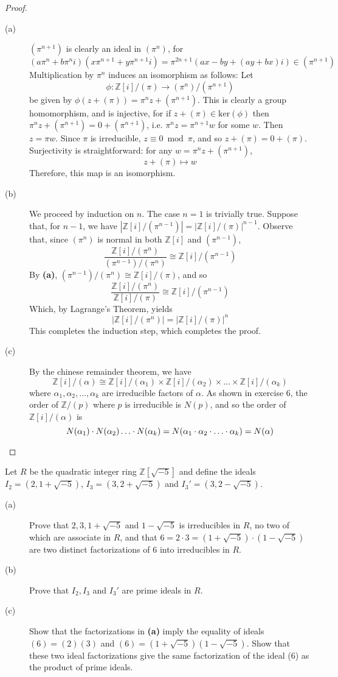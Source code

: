 \documentclass[12pt,leqno]{book}
\numberwithin{equation}{section}
\newcommand{\question}[2] {\vspace{.25in}\noindent\fbox{#1} #2 \vspace{.10in}}
\theoremstyle{definition}
\begin{document}
\begin{proof}\indent
 \begin{description}
  \item [(a)] $(\pi^{n+1})$ is clearly an ideal in $(\pi^n)$, for \[(a\pi^n+b\pi^ni)(x\pi^{n+1}+y\pi^{n+1}i)=\pi^{2n+1}(ax-by+(ay+bx)i)\in(\pi^{n+1})\] Multiplication by $\pi^n$ induces an isomorphism as follows: Let \[\phi:\mathbb{Z}[i]/(\pi)\to(\pi^n)/(\pi^{n+1})\] be given by $\phi(z+(\pi))=\pi^nz+(\pi^{n+1})$. This is clearly a group homomorphism, and is injective, for if $z+(\pi)\in\text{ker}(\phi)$ then $\pi^nz+(\pi^{n+1})=0+(\pi^{n+1})$, i.e. $\pi^nz=\pi^{n+1}w$ for some $w$. Then $z=\pi w$. Since $\pi$ is irreducible, $z\equiv0\bmod{\pi}$, and so $z+(\pi)=0+(\pi)$. Surjectivity is straightforward: for any $w=\pi^nz+(\pi^{n+1})$, \[z+(\pi)\mapsto w\] Therefore, this map is an isomorphism.
  \item [(b)] We proceed by induction on $n$. The case $n=1$ is trivially true. Suppose that, for $n-1$, we have $|\mathbb{Z}[i]/(\pi^{n-1})|=|\mathbb{Z}[i]/(\pi)|^{n-1}$. Observe that, since $(\pi^{n})$ is normal in both $\mathbb{Z}[i]$ and $(\pi^{n-1})$, \[\frac{\mathbb{Z}[i]/(\pi^n)}{(\pi^{n-1})/(\pi^n)}\cong\mathbb{Z}[i]/(\pi^{n-1})\] By \textbf{(a)}, $(\pi^{n-1})/(\pi^n)\cong\mathbb{Z}[i]/(\pi)$, and so \[\frac{\mathbb{Z}[i]/(\pi^n)}{\mathbb{Z}[i]/(\pi)}\cong\mathbb{Z}[i]/(\pi^{n-1})\] Which, by Lagrange's Theorem, yields \[|\mathbb{Z}[i]/(\pi^n)|=|\mathbb{Z}[i]/(\pi)|^n\] This completes the induction step, which completes the proof.
  \item [(c)] By the chinese remainder theorem, we have \[\mathbb{Z}[i]/(\alpha)\cong\mathbb{Z}[i]/(\alpha_1)\times\mathbb{Z}[i]/(\alpha_2)\times\hdots\times\mathbb{Z}[i]/(\alpha_k)\] where $\alpha_1,\alpha_2,\hdots,\alpha_k$ are irreducible factors of $\alpha$. As shown in exercise 6, the order of $\mathbb{Z}/(p)$ where $p$ is irreducible is $N(p)$, and so the order of $\mathbb{Z}[i]/(\alpha)$ is \[N(\alpha_1)\cdot N(\alpha_2)\hdots\cdot N(\alpha_k)=N(\alpha_1\cdot\alpha_2\cdot\hdots\cdot\alpha_k)=N(\alpha)\qedhere\]
 \end{description}
\end{proof}

\question{8}{Let $R$ be the quadratic integer ring $\mathbb{Z}[\sqrt{-5}]$ and define the ideals $I_2=(2,1+\sqrt{-5})$, $I_3=(3,2+\sqrt{-5})$ and $I_3'=(3,2-\sqrt{-5})$.}
\begin{description}
 \item [(a)] Prove that $2,3,1+\sqrt{-5}$ and $1-\sqrt{-5}$ is irreducibles in $R$, no two of which are associate in $R$, and that $6=2\cdot3=(1+\sqrt{-5})\cdot(1-\sqrt{-5})$ are two distinct factorizations of 6 into irreducibles in $R$.
 \item [(b)] Prove that $I_2,I_3$ and $I_3'$ are prime ideals in $R$. 
 \item [(c)] Show that the factorizations in \textbf{(a)} imply the equality of ideals $(6)=(2)(3)$ and $(6)=(1+\sqrt{-5})(1-\sqrt{-5})$. Show that these two ideal factorizations give the same factorization of the ideal (6) as the product of prime ideals.
\end{description}
\end{document}
